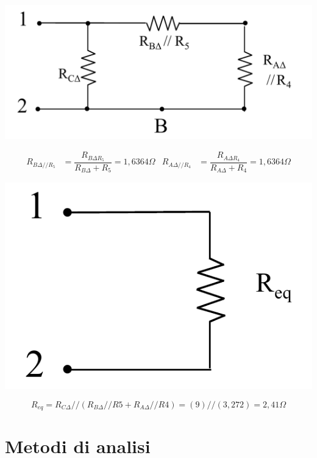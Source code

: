 \documentclass{article}
\begin{document}
\begin{center}
    \includegraphics[scale=0.3]{Image/Esempio2_3.png}
\end{center}
\begin{align*}
    R_{B\Delta // R_5} &= \dfrac{R_{B\Delta R_5}}{R_{B\Delta} + R_5} = 1,6364 \Omega & R_{A\Delta // R_4} &= \dfrac{R_{A\Delta R_4}}{R_{A\Delta} + R_4} = 1,6364 \Omega
\end{align*}
\begin{center}
    \includegraphics[scale=0.3]{Image/Esempio2_4.png}
\end{center}
\[
    R_{eq} = R_{C\Delta} // (R_{B\Delta} // R5 + R_{A\Delta} // R4) = (9)//(3,272) = 2,41 \Omega
\]







\section{Metodi di analisi}
\end{document}
